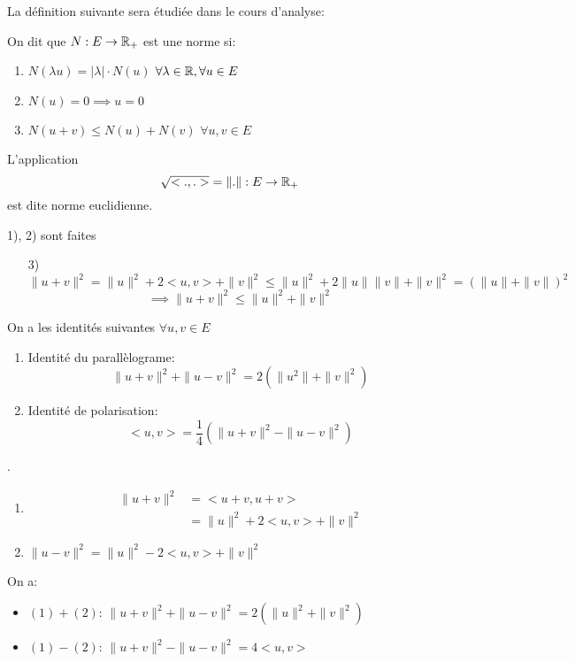 La définition suivante sera étudiée dans le cours d'analyse:
\begin{definition}
    On dit que $N: E \to \mathbb{R}_+$ est une norme si:
    \begin{enumerate}
        \item $N(\lambda u) = |\lambda| \cdot N(u)$ \quad  $\forall \lambda \in \mathbb{R}, \forall u \in E$
        \item $N(u) = 0 \implies u = 0$
        \item $N(u + v) \le N(u) + N(v)$ \quad $\forall u, v \in E$
    \end{enumerate}
\end{definition}
\begin{lemma}
   L'application
   \[
   \sqrt{<.,.>} = \| . \|: E \to \mathbb{R}_+ 
   \] 
   est dite norme euclidienne.
\end{lemma}
\begin{explanation}
    1), 2) sont faites\\
    \begin{itemize}
        \item[3)] $\| u + v \|^2 = \|u\|^2 + 2<u,v> + \|v\|^2 \le \|u\|^2 + 2\|u\|\|v\| + \|v\|^2 = (\|u\| + \|v\|)^2$
            \[
            \implies \|u + v\|^2 \le \|u\|^2 + \|v\|^2
            \] 
    \end{itemize}
\end{explanation}
\begin{prop}
   On a les identités suivantes $\forall u, v \in E$ 
   \begin{enumerate}
       \item Identité du parallèlograme:
           \[
           \|u + v\|^2 + \|u - v\|^2 = 2(\|u^2\| + \|v\|^2)
           \] 
       \item Identité de polarisation:
           \[
           <u, v> = \frac{1}{4}(\|u + v\|^2 - \|u - v\|^2)
           \] 
   \end{enumerate}
\end{prop}
\begin{explanation}.
   \begin{enumerate}
       \item 
           \begin{align*}
               \|u + v\|^2 &= <u + v, u + v>\\
                           &= \|u\|^2 + 2<u,v> + \|v\|^2
           \end{align*}
        \item $\|u - v\|^2 = \|u\|^2 - 2<u, v> + \|v\|^2$
   \end{enumerate} 
   On a:
   \begin{itemize}
       \item 
           $(1) + (2)$:  $\|u + v\|^2 + \|u - v\|^2 = 2 (\|u\|^2 + \|v\|^2)$
       \item $(1) - (2)$:  $\|u + v\|^2 - \|u - v\|^2 = 4<u, v>$ 
   \end{itemize}
\end{explanation}
